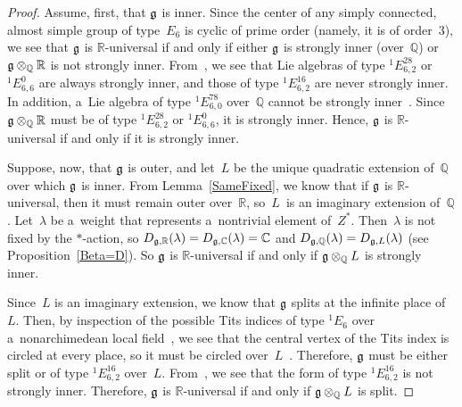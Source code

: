 \begin{proof}
Assume, f\/irst, that $\Lie G$ is inner.
Since the center of any simply connected, almost simple group of type~$E_6$ is cyclic of prime order (namely, it is of
order~$3$), we see that $\Lie G$ is $\mathbb{R}$-universal if and only if either $\Lie G$ is strongly inner
(over~$\mathbb{Q}$) or $\Lie G \otimes_\mathbb{Q} \mathbb{R}$ is not strongly inner.
From~\cite[\S~6.4.5]{Tits-RepLinIrred}, we see that Lie algebras of type ${}^1 E^{28}_{6,2}$ or ${}^1 E^{0}_{6,6}$ are
always strongly inner, and those of type ${}^1 E^{16}_{6,2}$ are never strongly inner.
In addition, a~Lie algebra of type ${}^1 E^{78}_{6,0}$ over~$\mathbb{Q}$ cannot be strongly inner~\cite[Propositions~4
and~5]{Tits-StronglyInner}.
Since $\Lie G \otimes_\mathbb{Q} \mathbb{R}$ must be of type ${}^1 E^{28}_{6,2}$ or ${}^1 E^{0}_{6,6}$, it is strongly
inner.
Hence, $\Lie G$ is $\mathbb{R}$-universal if and only if it is strongly inner.

Suppose, now, that $\Lie G$ is outer, and let~$L$ be the unique quadratic extension of~$\mathbb{Q}$ over which $\Lie
G$ is inner.
From Lemma~\ref{SameFixed}, we know that if $\Lie G$ is $\mathbb{R}$-universal, then it must remain outer over~$\mathbb{R}$,
so~$L$~is an imaginary extension of~$\mathbb{Q}$.
Let~$\lambda$ be a~weight that represents a~nontrivial element of~$Z^*$.
Then~$\lambda$ is not f\/ixed by the $*$-action, so $D_{\Lie G, \mathbb{R}}(\lambda) = D_{\Lie G, \mathbb{C}}(\lambda) =
\mathbb{C}$ and $D_{\Lie G, \mathbb{Q}}(\lambda) = D_{\Lie G, L}(\lambda)$ (see Proposition~\ref{Beta=D}).
So $\Lie G$ is $\mathbb{R}$-universal if and only if $\Lie G \otimes_\mathbb{Q} L$ is strongly inner.

Since~$L$ is an imaginary extension, we know that $\Lie G$ splits at the inf\/inite place of~$L$.
Then, by inspection of the possible Tits indices of type ${}^1 E_6$ over a~nonarchimedean local
f\/ield~\cite[p.~58]{Tits-Classification}, we see that the central vertex of the Tits index is circled at every place, so
it must be circled over~$L$~\cite[Satz~4.3.3]{Harder-BerichtNeuere}.
Therefore, $\Lie G$ must be either split or of type ${}^1 E_{6,2}^{16}$ over~$L$.
From~\cite[\S~6.4.5]{Tits-RepLinIrred}, we see that the form of type ${}^1 E_{6,2}^{16}$ is not strongly inner.
Therefore, $\Lie G$ is $\mathbb{R}$-universal if and only if $\Lie G \otimes_\mathbb{Q} L$ is split.
\end{proof}

